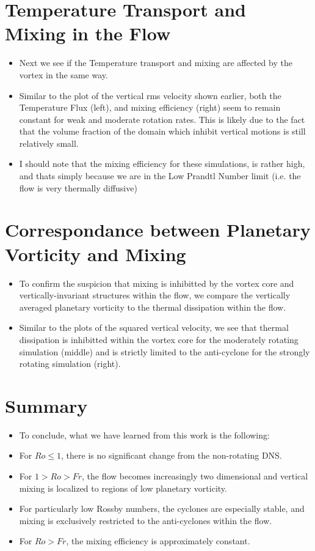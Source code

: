 \documentclass{article}
\begin{document}
\section{Temperature Transport and Mixing in the Flow}
\begin{itemize}
    \item Next we see if the Temperature transport and mixing are affected by
    the vortex in the same way. 
    \item Similar to the plot of the vertical rms velocity shown earlier, both
    the Temperature Flux (left), and mixing efficiency (right) seem to remain constant for
    weak and moderate rotation rates. This is likely due to the fact that the
    volume fraction of the domain which inhibit vertical motions is still
    relatively small.  
    \item I should note that the mixing efficiency for these simulations,
    is rather high, and thats simply because we are in the Low Prandtl Number
    limit (i.e. the flow is very thermally diffusive)
\end{itemize}

\section{Correspondance between Planetary Vorticity and Mixing}
\begin{itemize}
    \item To confirm the suspicion that mixing is inhibitted by the vortex core
    and vertically-invariant structures within the flow, we compare the
    vertically averaged planetary vorticity to the thermal dissipation within
    the flow. 
    \item Similar to the plots of the squared vertical velocity, we see that
    thermal dissipation is inhibitted within the vortex core for the
    moderately rotating simulation (middle) and is strictly limited to the
    anti-cyclone for the strongly rotating simulation (right). 
\end{itemize}

\section{Summary}
\begin{itemize}
    \item To conclude, what we have learned from this work is the following:
    \item For $Ro \le 1$, there is no significant change from the non-rotating
    DNS. 
    \item For $1 > Ro > Fr$, the flow becomes increasingly two dimensional and
    vertical mixing is localized to regions of low planetary vorticity. 
    \item For particularly low Rossby numbers, the cyclones are especially
    stable, and mixing is exclusively restricted to the anti-cyclones
    within the flow. 
    \item For $Ro > Fr$, the mixing efficiency is approximately constant. 
\end{itemize}
\end{document}
